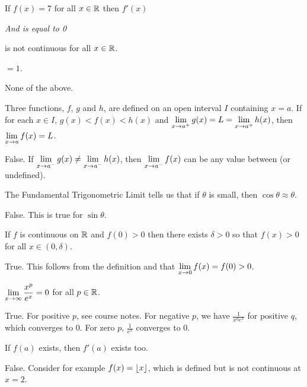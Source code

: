 \question If $f(x)=7$ for all $x \in \mathbb{R}$ then $f'(x)$
\begin{choices}
  \item {} \emph{And is equal to 0}
  \item is not continuous for all $x \in \mathbb{R}$.
  \item $= 1$.
  \item None of the above.
\end{choices}


\setcounter{paragraph}{5}

\question Three functions, $f$, $g$ and $h$, are defined on an open interval $I$ containing $x=a$.
If for each $x \in I$, $g(x)< f(x)< h(x)$ and $\displaystyle\lim_{x\to a^+} g(x) = L = \displaystyle\lim_{x\to a^+} h(x)$, then $\displaystyle\lim_{x\to a} f(x) = L$.

False. If $\displaystyle\lim_{x\to a^-} g(x) \neq \displaystyle\lim_{x\to a^-} h(x)$, then $\displaystyle\lim_{x\to a^-} f(x)$ can be any value between (or undefined).

\question The Fundamental Trigonometric Limit tells us that if $\theta$ is small, then $\cos\theta \approx \theta$.

False. This is true for $\sin\theta$.

\question If $f$ is continuous on $\mathbb{R}$ and $f(0) > 0$ then there exists $\delta > 0$ so that $f(x) > 0$ for all $x\in(0,\delta)$.

True. This follows from the \epsdel{} definition and that $\displaystyle\lim_{x\to0}f(x)=f(0)>0$.

\question $\displaystyle\lim_{x\to\infty} \frac{x^p}{e^x}=0$ for all $p \in \mathbb{R}$.

True. For positive $p$, see course notes.
For negative $p$, we have $\frac{1}{x^q e^x}$ for positive $q$, which converges to 0.
For zero $p$, $\frac{1}{e^x}$ converges to 0.

\question If $f(a)$ exists, then $f'(a)$ exists too.

False. Consider for example $f(x)=\lfloor x\rfloor$, which is defined but is not continuous at $x=2$.



